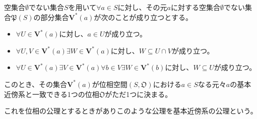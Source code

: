 \documentclass[dvipdfmx]{jsarticle}
\begin{document}
\begin{thm}\label{8.1.2.14}
空集合$\emptyset$でない集合$S$を用いて$\forall a \in S$に対し、その元$a$に対する空集合$\emptyset$でない集合$\mathfrak{P}(S)$の部分集合$\mathbf{V}^{*}(a)$が次のことが成り立つとする。
\begin{itemize}
\item
  $\forall U \in \mathbf{V}^{*}(a)$に対し、$a \in U$が成り立つ。
\item
  $\forall U,V \in \mathbf{V}^{*}(a)\exists W \in \mathbf{V}^{*}(a)$に対し、$W \subseteq U \cap V$が成り立つ。
\item
  $\forall U \in \mathbf{V}^{*}(a)\exists V \in \mathbf{V}^{*}(a)\forall b \in V\exists W \in \mathbf{V}^{*}(b)$に対し、$W \subseteq U$が成り立つ。
\end{itemize}
このとき、その集合$\mathbf{V}^{\mathbf{*}}(a)$が位相空間$\left( S,\mathfrak{O} \right)$における$a \in S$なる元々$a$の基本近傍系と一致できる1つの位相$\mathfrak{O}$がただ1つに決まる。\par
これを位相の公理とするときがありこのような公理を基本近傍系の公理という。
\end{thm}
\end{document}
